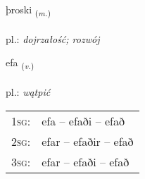 \documentclass[frontgrid, backgrid]{flacards}\usepackage[]{graphicx}\usepackage[]{xcolor}
\begin{document}
\renewcommand{\blhead}{\vskip5pt {\small\bfseries\footnotesize Nafnorð | Noun }}
\renewcommand{\bcfoot}{\vskip5pt \hspace{2pt}{\small\bfseries\footnotesize 2K}}


{þroski \small{\textsubscript{(\textit{m.})}} \\[1ex] %
\textphonetic{[θrɔscɪ]} \\
pl.: \emph{dojrzałość; rozwój} \\  [2ex]
\renewcommand*{\arraystretch}{0.8}
}

\renewcommand{\flhead}{\vskip5pt \fboxsep=0pt {\small\bfseries\footnotesize Sagnorð | Verb}}
\renewcommand{\fcfoot}{\vskip5pt \fboxsep=0pt \hspace{2pt}{\small\bfseries\footnotesize 2K}}

\renewcommand{\blhead}{\vskip5pt {\small\bfseries\footnotesize Sagnorð | Verb }}
\renewcommand{\bcfoot}{\vskip5pt \hspace{2pt}{\small\bfseries\footnotesize 2K}}


{efa \small{\textsubscript{(\textit{v.})}} \\[1ex] %
\textphonetic{[ɛːva]} \\
pl.: \emph{wątpić} \\  [2ex]
\renewcommand*{\arraystretch}{0.8}
\begin{tabular}{p{1cm}l}
\textsc{1sg}: & efa -- efaði -- efað \\ 
\textsc{2sg}: & efar -- efaðir -- efað \\ 
\textsc{3sg}: & efar -- efaði -- efað \\ 
\end{tabular}
}

\renewcommand{\flhead}{\vskip5pt \fboxsep=0pt {\small\bfseries\footnotesize Sagnorð | Verb}}
\renewcommand{\fcfoot}{\vskip5pt \fboxsep=0pt \hspace{2pt}{\small\bfseries\footnotesize 2K}}
\end{document}
